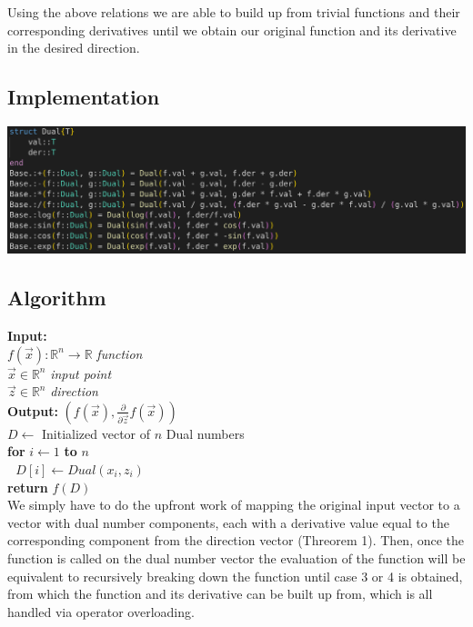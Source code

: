 \documentclass[a0,landscape]{a0poster}
\begin{document}
\begin{multicols}{4}
Using the above relations we are able to build up from trivial functions and their corresponding
derivatives until we obtain our original function and its derivative in the desired direction.
\vspace{-1cm}
\subsection*{Implementation}
\vspace{-1cm}
\begin{center}
    \includegraphics[width=250mm]{figures/forward_mode.png}
\end{center}
\vspace{-1cm}
\subsection*{Algorithm}
    \textbf{Input:} \\ 
    $f(\vec{x}):\mathbb{R}^n\rightarrow\mathbb{R}$ \quad \textit{function} \\
    $\vec{x}\in\mathbb{R}^n$ \quad \textit{input point} \\
    $\vec{z}\in\mathbb{R}^n$ \quad \textit{direction} \\
    \textbf{Output:} $(f(\vec{x}),\frac{\partial}{\partial\vec{z}}f(\vec{x}))$ \\
    $D\leftarrow$ Initialized vector of $n$ Dual numbers \\
    \textbf{for } $i\leftarrow1$\textbf{ to } $n$ \\
    $\text{    } D[i]\leftarrow Dual(x_i, z_i)$ \\
    \textbf{return} $f(D)$ \\

We simply have to do the upfront work of mapping the original input vector to 
a vector with dual number components, each with a derivative value equal to the
corresponding component from the direction vector (Threorem 1). Then, once the function
is called on the dual number vector the evaluation of the function will be equivalent
to recursively breaking down the function until case 3 or 4 is obtained, from which 
the function and its derivative can be built up from, which is all handled via operator
overloading.


\end{multicols}
\end{document}
